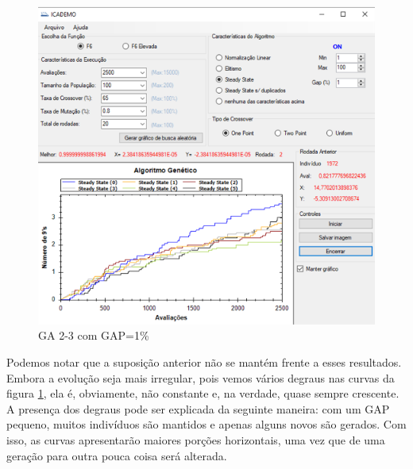 \documentclass[12pt]{article}
\begin{document}
\begin{figure}[H]
	\centering
	\includegraphics[width=0.7\linewidth]{Imagens/questao8_GAPpequeno}
	\caption{GA 2-3 com GAP=1\%}
	\label{fig:questao8GAPpequeno}
\end{figure}

Podemos notar que a suposição anterior não se mantém frente a esses resultados. Embora a evolução seja mais irregular, pois vemos vários degraus nas curvas da figura \ref{fig:questao8GAPpequeno}, ela é, obviamente, não constante e, na verdade, quase sempre crescente. A presença dos degraus pode ser explicada da seguinte maneira: com um GAP pequeno, muitos indivíduos são mantidos e apenas alguns novos são gerados. Com isso, as curvas apresentarão maiores porções horizontais, uma vez que de uma geração para outra pouca coisa será alterada.

	 
	
\end{document}
